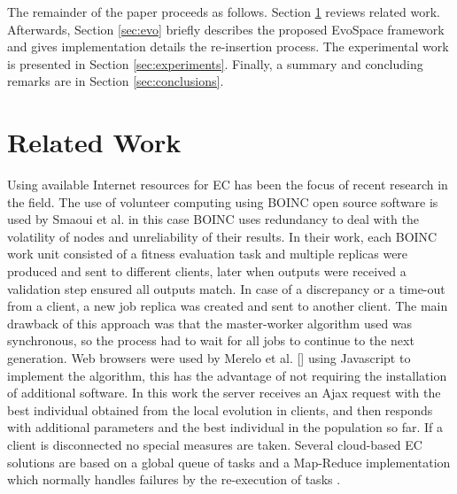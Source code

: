 \documentclass{llncs}
\begin{document}
The remainder of the paper proceeds as follows. Section \ref{sec:work} reviews related work. Afterwards, Section \ref{sec:evo} briefly describes the proposed EvoSpace framework and gives implementation details the re-insertion process.
The experimental work is presented in Section \ref{sec:experiments}.
Finally, a summary and concluding remarks are in Section \ref{sec:conclusions}.

\section{Related Work}
\label{sec:work}
Using available Internet resources for EC has been the focus of recent research in the field. The use of volunteer computing using BOINC open source software is used by Smaoui et al.  \cite{FekiNG09} in this case BOINC uses redundancy to deal with the volatility of nodes and unreliability of their results. In their work, each BOINC work unit consisted of a fitness evaluation task and multiple replicas were produced and sent to different clients, later when outputs were received a validation step ensured all outputs match. In case of a discrepancy or a time-out from a client, a new job replica was created and sent to another client. The main drawback of this approach was that the master-worker algorithm used was synchronous, so the process had to wait for all jobs to continue to the next generation. Web browsers were used by Merelo et al. [] using Javascript to implement the algorithm, this has the advantage of not requiring the installation of additional software. In this work the server receives an Ajax request with the best individual obtained from the local evolution in clients, and then responds with additional parameters and the best individual in the population so far. If a client is disconnected no special measures are taken. Several cloud-based EC solutions are based on a  global queue of tasks and a Map-Reduce implementation which normally handles failures by the re-execution of tasks \cite{fazenda2012,di2013towards,FlexGP}. 

\end{document}
